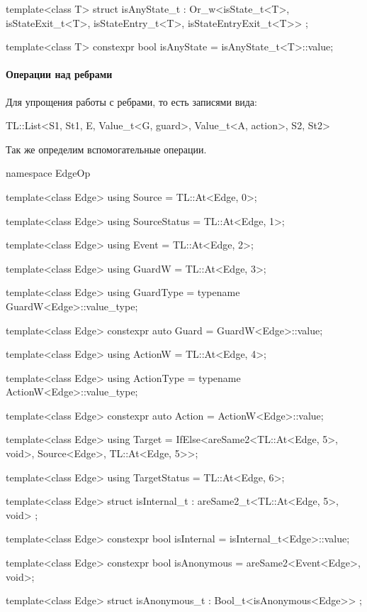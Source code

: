 \documentclass{article}
\begin{document}
{\begin{cppcode}
template<class T>
struct isAnyState_t : Or_w<isState_t<T>, isStateExit_t<T>,
                           isStateEntry_t<T>, isStateEntryExit_t<T>> {};

template<class T>
constexpr bool isAnyState = isAnyState_t<T>::value;
\end{cppcode}

\paragraph{Операции над ребрами}

Для упрощения работы с ребрами, то есть записями вида:
\begin{cppcode}[\nonumbers]
TL::List<S1, St1, E, Value_t<G, guard>, Value_t<A, action>, S2, St2>
\end{cppcode}
Так же определим вспомогательные операции.
\begin{cppcode}

namespace EdgeOp {
template<class Edge>
using Source = TL::At<Edge, 0>;

template<class Edge>
using SourceStatus = TL::At<Edge, 1>;

template<class Edge>
using Event = TL::At<Edge, 2>;

template<class Edge>
using GuardW = TL::At<Edge, 3>;

template<class Edge>
using GuardType = typename GuardW<Edge>::value_type;

template<class Edge>
constexpr auto Guard = GuardW<Edge>::value;

template<class Edge>
using ActionW = TL::At<Edge, 4>;

template<class Edge>
using ActionType = typename ActionW<Edge>::value_type;

template<class Edge>
constexpr auto Action = ActionW<Edge>::value;

template<class Edge>
using Target =
    IfElse<areSame2<TL::At<Edge, 5>, void>, Source<Edge>, TL::At<Edge, 5>>;

template<class Edge>
using TargetStatus = TL::At<Edge, 6>;

template<class Edge>
struct isInternal_t : areSame2_t<TL::At<Edge, 5>, void> {};

template<class Edge>
constexpr bool isInternal = isInternal_t<Edge>::value;

template<class Edge>
constexpr bool isAnonymous = areSame2<Event<Edge>, void>;

template<class Edge>
struct isAnonymous_t : Bool_t<isAnonymous<Edge>> {};

}
\end{cppcode}}
\end{document}

